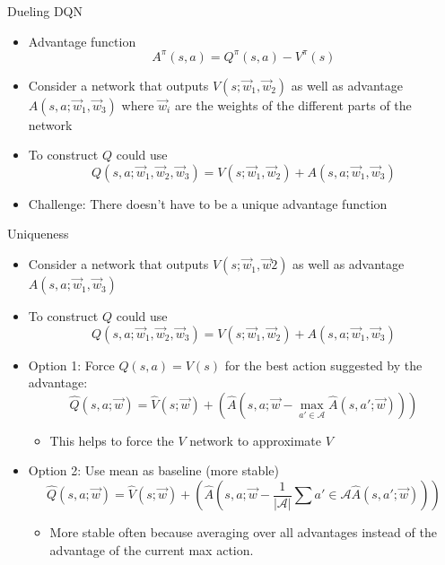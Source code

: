 \begin{frame}[c]{Dueling DQN }
	
	\begin{itemize}
	\item Advantage function 
	$$A^\pi (s,a) = Q^\pi(s,a) - V^\pi(s) $$
	\item Consider a network that outputs $V(s; \vec{w}_1, \vec{w}_2)$ as well as advantage $A(s,a; \vec{w}_1, \vec{w}_3)$ where $\vec{w}_i$ are the weights of the different parts of the network
	\item To construct $Q$ could use $$Q(s,a;\vec{w}_1, \vec{w}_2, \vec{w}_3) = V(s;\vec{w}_1, \vec{w}_2) + A(s,a;\vec{w}_1, \vec{w}_3)$$
	\bigskip
	\pause
	\item Challenge: There doesn't have to be a unique advantage function

	\end{itemize}
	
\end{frame}
\begin{frame}[c]{Uniqueness}
	
	\begin{itemize}
		\item Consider a network that outputs $V(s;\vec{w}_1, \vec{w}2)$ as well as advantage $A(s,a; \vec{w}_1, \vec{w}_3)$
		\item To construct $Q$ could use $$Q(s,a;\vec{w}_1, \vec{w}_2, \vec{w}_3) = V(s;\vec{w}_1, \vec{w}_2) + A(s,a;\vec{w}_1, \vec{w}_3)$$
		\item Option 1: Force $Q(s,a) = V(s)$ for the best action suggested by the advantage:
		$$\hat{Q}(s,a;\vec{w}) = \hat{V}(s;\vec{w}) + \left( \hat{A}(s,a;\vec{w} - \max_{a' \in \mathcal{A}} \hat{A}(s,a';\vec{w})) \right) $$
		\vspace{-1em}
		\begin{itemize}
			\item This helps to force the $V$ network to approximate $V$
		\end{itemize}
		\item Option 2: Use mean as baseline (more stable)
		$$\hat{Q}(s,a;\vec{w}) = \hat{V}(s;\vec{w}) + \left( \hat{A}(s,a;\vec{w} - \frac{1}{|\mathcal{A}|} \sum{a' \in \mathcal{A}} \hat{A}(s,a';\vec{w})) \right) $$
		\vspace{-1em}
		\begin{itemize}
			\item More stable often because averaging over all advantages instead of
			the advantage of the current max action.
		\end{itemize}
	\end{itemize}
	
\end{frame}
